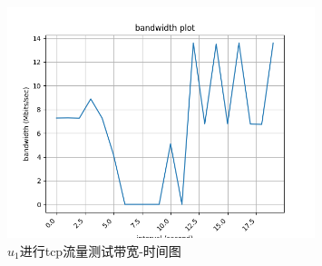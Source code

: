 \begin{figure}[h]
	\centering
	\includegraphics[width=0.8\textwidth]{image/u1.tcp.png}
	\caption{$u_1$进行tcp流量测试带宽-时间图}
 	\label{fig:topo3}
\end{figure}